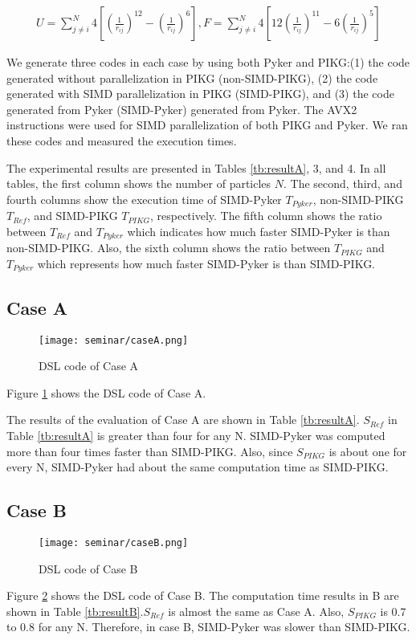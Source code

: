 \documentclass[ams]{article}
\begin{document}
\begin{align}\label{eq:lennard}
U =\sum\limits_{j\neq i}^N  4 \left[ \left( \frac{1}{r_{ij}} \right)^{12} - \left( \frac{1}{r_{ij}} \right)^{6} 
\right],
F =\sum\limits_{j\neq i}^N  4 \left[ 12\left( \frac{1}{r_{ij}} \right)^{11} - 6\left( \frac{1}{r_{ij}} \right)^{5}\right]
\end{align}

We generate three codes in each case by using both Pyker and PIKG:(1) the code generated without parallelization in PIKG (non-SIMD-PIKG), (2) the code generated with SIMD parallelization in PIKG (SIMD-PIKG), and (3) the code generated from Pyker (SIMD-Pyker) generated from Pyker. The AVX2 instructions were used for SIMD parallelization of both PIKG and Pyker. We ran these codes and measured the execution times.


The experimental results are presented in Tables \ref{tb:resultA}, 3, and 4. In all tables, the first column shows the number of particles $N$. The second, third, and fourth columns show the execution time of SIMD-Pyker $T_{Pyker}$, non-SIMD-PIKG $T_{Ref}$, and SIMD-PIKG $T_{PIKG}$, respectively. The fifth column shows the ratio between $T_{Ref}$ and $T_{Pyker}$ which indicates how much faster SIMD-Pyker is than non-SIMD-PIKG. Also, the sixth column shows the ratio between $T_{PIKG}$ and $T_{Pyker}$ which represents how much faster SIMD-Pyker is than SIMD-PIKG.


    \subsection{Case A}
\begin{figure}[htbp]
\centering
\texttt{[image: seminar/caseA.png]}
\caption{DSL code of Case A}
\label{fig:caseA}
\end{figure}

Figure \ref{fig:caseA} shows the DSL code of Case A.

The results of the evaluation of Case A are shown in Table \ref{tb:resultA}.
$S_{Ref}$ in Table \ref{tb:resultA} is greater than four for any N. SIMD-Pyker was computed more than four times faster than SIMD-PIKG. Also, since $S_{PIKG}$ is about one for every N, SIMD-Pyker had about the same computation time as SIMD-PIKG.



\subsection{Case B}
\begin{figure}[htbp]
\centering
\texttt{[image: seminar/caseB.png]}
\caption{DSL code of Case B}
\label{fig:CaseB}
\end{figure}
Figure \ref{fig:CaseB} shows the DSL code of Case B.
The computation time results in B are shown in Table \ref{tb:resultB}.$S_{Ref}$ is almost the same as Case A. Also, $S_{PIKG}$ is 0.7 to 0.8 for any N. Therefore, in case B, SIMD-Pyker was slower than SIMD-PIKG.
\end{document}
